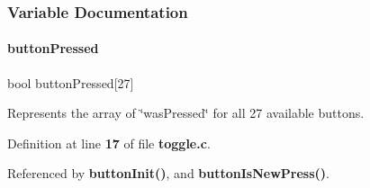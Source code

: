 \subsubsection{Variable Documentation}
\mbox{\label{a00146_a66c983ca3b3f041a4e293f814a41198f}} 
\paragraph{button\+Pressed}
{\footnotesize\ttfamily bool button\+Pressed[27]}



Represents the array of \char`\"{}was\+Pressed\char`\"{} for all 27 available buttons. 



Definition at line \textbf{ 17} of file \textbf{ toggle.\+c}.



Referenced by \textbf{ button\+Init()}, and \textbf{ button\+Is\+New\+Press()}.

